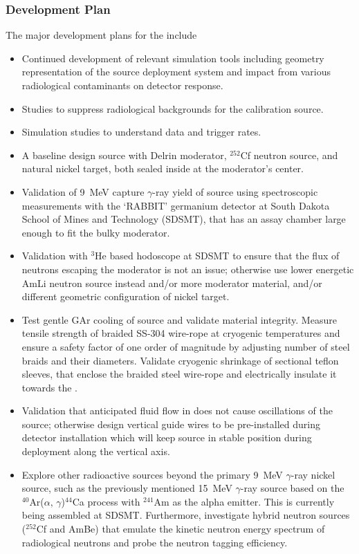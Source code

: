 \subsubsection{Development Plan}
The major development plans for the  include
\begin{itemize}
\item Continued development of relevant simulation tools including geometry representation of the source deployment system and impact from various radiological contaminants on detector response. 
\item Studies to suppress radiological backgrounds for the calibration source.
\item Simulation studies to understand data and trigger rates.
\item A baseline design source with Delrin moderator, $^{252}$Cf neutron source, and natural nickel target, both sealed inside at the moderator's center.
\item Validation of \SI{9}{\MeV} capture $\gamma$-ray yield of source using spectroscopic measurements with the `RABBIT' germanium detector at South Dakota School of Mines and Technology (SDSMT), that has an assay chamber large enough to fit the bulky moderator. 
\item Validation with $^{3}$He based hodoscope at SDSMT to ensure that the flux of neutrons escaping the moderator is not an issue; otherwise use lower energetic AmLi neutron source instead and/or more moderator material, and/or different geometric configuration of nickel target. 
\item Test gentle GAr cooling of source and validate material integrity. Measure tensile strength of braided SS-304 wire-rope at cryogenic temperatures and ensure a safety factor of one order of magnitude by adjusting number of steel braids and their diameters. Validate cryogenic shrinkage of sectional teflon sleeves, that enclose the braided steel wire-rope and electrically insulate it towards the . 
\item Validation that anticipated fluid flow in  does not cause oscillations of the source; otherwise design vertical guide wires to be pre-installed during detector installation 
which will keep source in stable position during deployment along the vertical axis.
\item Explore other radioactive sources beyond the primary %
\SI{9}{\MeV} $\gamma$-ray nickel source, such as the previously mentioned \SI{15}{\MeV} $\gamma$-ray source based on the  $^{40}$Ar($\alpha,\,\gamma$)$^{44}$Ca process with $^{241}$Am as the alpha emitter. This is currently being assembled at SDSMT.
Furthermore, investigate hybrid neutron sources ($^{252}$Cf and AmBe) that emulate the kinetic neutron energy spectrum of radiological neutrons and probe the neutron tagging efficiency.
\end{itemize}

